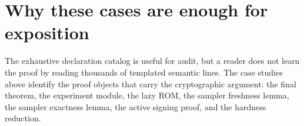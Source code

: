 \section{Why these cases are enough for exposition}

The exhaustive declaration catalog is useful for audit, but a reader does not
learn the proof by reading thousands of templated semantic lines.  The case
studies above identify the proof objects that carry the cryptographic argument:
the final theorem, the experiment module, the lazy ROM, the sampler freshness
lemma, the sampler exactness lemma, the active signing proof, and the hardness
reduction.
